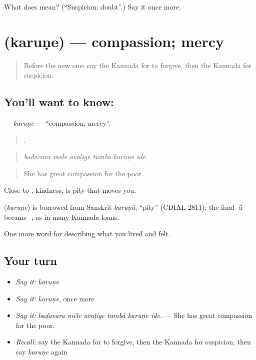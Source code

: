 \begin{tcolorbox}[breakable,colback=teal!4,colframe=teal!35!black,title={Before you move on}]
What does  mean? (\textquotedblleft{}Suspicion; doubt\textquotedblright{}.) Say it once more.
\end{tcolorbox}
\section[\texorpdfstring{\kn{ಕರುಣೆ} (karuṇe)}{ಕರುಣೆ (karuṇe)}]{ (karuṇe) — compassion; mercy}

\label{lesson:KA-C498-karune}



\begin{quote}
Before the new one: say the Kannada for to forgive, then the Kannada for suspicion.
\end{quote}

\subsection*{You'll want to know: }
\textbf{} — \emph{karuṇe} — \textquotedblleft{}compassion; mercy\textquotedblright{}.

\begin{quote}
     .
\end{quote}

\begin{quote}
\emph{baḍavara mēle avaḷige tumbā karuṇe ide.}
\end{quote}

\begin{quote}
She has great compassion for the poor.
\end{quote}

Close to , kindness;  is pity that moves you.

\begin{cousinweb}
\textbf{} (\emph{karuṇe}) is borrowed from Sanskrit \emph{karuṇā}, \textquotedblleft{}pity\textquotedblright{} (CDIAL 2811); the final -ā became -, as in many Kannada loans.
\end{cousinweb}

\begin{grammarlens}[title={What you've built}]
One more word for describing what you lived and felt.
\end{grammarlens}

\subsection*{Your turn}
\begin{itemize}
\raggedright
  \item \emph{Say it:} \emph{karuṇe}
  \item \emph{Say it:} \emph{karuṇe}, once more
  \item \emph{Say it:} \emph{baḍavara mēle avaḷige tumbā karuṇe ide.} — She has great compassion for the poor.
  \item \emph{Recall:} say the Kannada for to forgive, then the Kannada for suspicion, then say \emph{karuṇe} again
\end{itemize}

